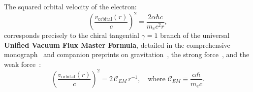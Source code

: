 \documentclass[11pt,a4paper]{article}
\begin{document}
The squared orbital velocity of the electron:
\begin{equation}
    \left( \frac{v_{\mathrm{orbital}}(r)}{c} \right)^2 = \frac{2 \alpha \hbar c}{m_e c^2 r},
    \label{eq:em_master_tr}
\end{equation}
corresponds precisely to the chiral tangential $\gamma = 1$ branch of the universal \textbf{Unified Vacuum Flux Master Formula}, detailed in the comprehensive monograph~\cite{main_paper} and companion preprints on gravitation~\cite{paper1}, the strong force~\cite{paper3}, and the weak force~\cite{paper4}:
\begin{equation}
    \boxed{ \left( \frac{v_{\mathrm{orbital}}(r)}{c} \right)^2 = 2 \, \mathcal{C}_{EM} \, r^{-1}, \quad \text{where } \mathcal{C}_{EM} \equiv \frac{\alpha \hbar}{m_e c}. }
\end{equation}
\end{document}
